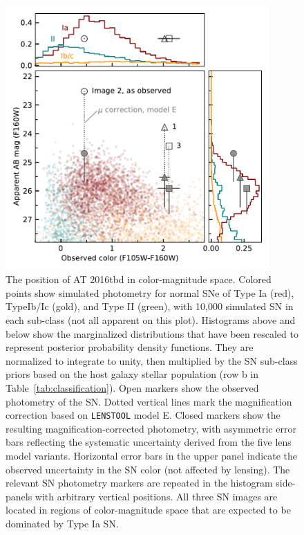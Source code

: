 \documentclass[12pt]{article}
\def\SNABC{AT 2016tbd\xspace}
\def\lenstool{{\tt LENSTOOL}\xspace}
\begin{document}
\begin{figure}
    \centering
    \includegraphics[width=0.9\textwidth]{Paper/Figures/colormag_classification_supplement.pdf}
    \caption{The position of \SNABC in color-magnitude space.
    Colored points show simulated photometry for normal SNe of Type Ia (red), TypeIb/Ic (gold), and Type II (green), with 10,000 simulated SN in each sub-class (not all apparent on this plot).  Histograms above and below show the marginalized distributions that have been rescaled to represent posterior probability density functions. They are normalized to integrate to unity, then multiplied by the SN sub-class priors based on the host galaxy stellar population (row b in Table~\ref{tab:classification}).  Open markers show the observed photometry of the SN. Dotted vertical lines mark the magnification correction based on \lenstool model E.  Closed markers show the resulting magnification-corrected photometry, with asymmetric error bars reflecting the systematic uncertainty derived from the five lens model variants.  Horizontal error bars in the upper panel indicate the observed uncertainty in 
    the SN color (not affected by lensing).  The relevant SN photometry markers are repeated in the histogram side-panels with arbitrary vertical positions.  All three SN images are located in regions of color-magnitude space that are expected to be dominated by Type Ia SN.}
    \label{fig:colormag_classification_supplement}
\end{figure}
\end{document}
